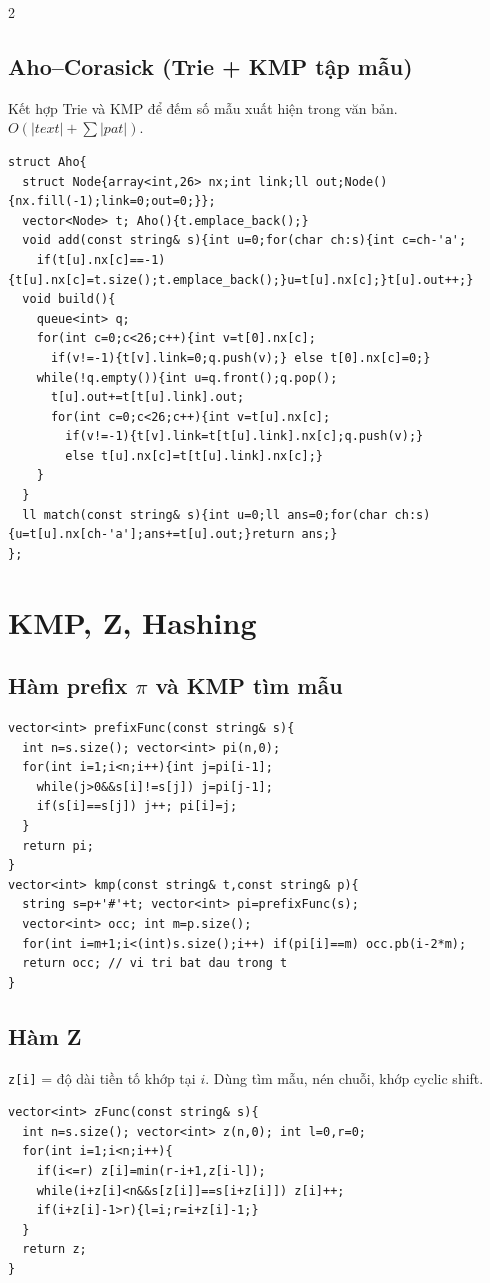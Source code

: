 \documentclass[8pt]{extarticle}
\begin{document}
\begin{multicols}{2}
\subsection{Aho--Corasick (Trie + KMP tập mẫu)}
Kết hợp Trie và KMP để đếm số mẫu xuất hiện trong văn bản. $O(|text|+\sum|pat|)$.
\begin{lstlisting}
struct Aho{
  struct Node{array<int,26> nx;int link;ll out;Node(){nx.fill(-1);link=0;out=0;}};
  vector<Node> t; Aho(){t.emplace_back();}
  void add(const string& s){int u=0;for(char ch:s){int c=ch-'a';
    if(t[u].nx[c]==-1){t[u].nx[c]=t.size();t.emplace_back();}u=t[u].nx[c];}t[u].out++;}
  void build(){
    queue<int> q; 
    for(int c=0;c<26;c++){int v=t[0].nx[c];
      if(v!=-1){t[v].link=0;q.push(v);} else t[0].nx[c]=0;}
    while(!q.empty()){int u=q.front();q.pop();
      t[u].out+=t[t[u].link].out;
      for(int c=0;c<26;c++){int v=t[u].nx[c];
        if(v!=-1){t[v].link=t[t[u].link].nx[c];q.push(v);}
        else t[u].nx[c]=t[t[u].link].nx[c];}
    }
  }
  ll match(const string& s){int u=0;ll ans=0;for(char ch:s){u=t[u].nx[ch-'a'];ans+=t[u].out;}return ans;}
};
\end{lstlisting}

\section{KMP, Z, Hashing}
\subsection{Hàm prefix $\pi$ và KMP tìm mẫu}
\begin{lstlisting}
vector<int> prefixFunc(const string& s){
  int n=s.size(); vector<int> pi(n,0);
  for(int i=1;i<n;i++){int j=pi[i-1];
    while(j>0&&s[i]!=s[j]) j=pi[j-1];
    if(s[i]==s[j]) j++; pi[i]=j;
  }
  return pi;
}
vector<int> kmp(const string& t,const string& p){
  string s=p+'#'+t; vector<int> pi=prefixFunc(s);
  vector<int> occ; int m=p.size();
  for(int i=m+1;i<(int)s.size();i++) if(pi[i]==m) occ.pb(i-2*m);
  return occ; // vi tri bat dau trong t
}
\end{lstlisting}

\subsection{Hàm Z}
\texttt{z[i]} = độ dài tiền tố khớp tại $i$. Dùng tìm mẫu, nén chuỗi, khớp cyclic shift.
\begin{lstlisting}
vector<int> zFunc(const string& s){
  int n=s.size(); vector<int> z(n,0); int l=0,r=0;
  for(int i=1;i<n;i++){
    if(i<=r) z[i]=min(r-i+1,z[i-l]);
    while(i+z[i]<n&&s[z[i]]==s[i+z[i]]) z[i]++;
    if(i+z[i]-1>r){l=i;r=i+z[i]-1;}
  }
  return z;
}
\end{lstlisting}


\end{multicols}
\end{document}
